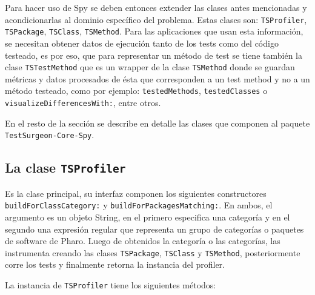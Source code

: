 \par Para hacer uso de Spy se deben entonces extender las clases antes mencionadas y acondicionarlas al dominio específico del problema. Estas clases son: {\tt TSProfiler}, {\tt TSPackage}, {\tt TSClass}, {\tt TSMethod}. Para las aplicaciones que usan esta información, se necesitan obtener datos de ejecución tanto de los tests como del código testeado, es por eso, que para representar un método de test se tiene también la clase {\tt TSTestMethod} que es un wrapper de la clase {\tt TSMethod} donde se guardan métricas y datos procesados de ésta que corresponden a un test method y no a un método testeado, como por ejemplo: {\tt testedMethods}, {\tt testedClasses} o {\tt visualizeDifferencesWith:}, entre otros.

\par En el resto de la sección se describe en detalle las clases que componen al paquete {\tt TestSurgeon-Core-Spy}.

\subsection{La clase {\tt TSProfiler}}

\par Es la clase principal, su interfaz componen los siguientes constructores {\tt buildForClassCategory:} y {\tt buildForPackagesMatching:}. En ambos, el argumento es un objeto String, en el primero especifica una categoría y en el segundo una expresión regular que representa un grupo de categorías o paquetes de software de Pharo. Luego de obtenidos la categoría o las categorías, las instrumenta creando las clases {\tt TSPackage}, {\tt TSClass} y {\tt TSMethod}, posteriormente corre los tests y finalmente retorna la instancia del profiler.

\par La instancia de {\tt TSProfiler} tiene los siguientes métodos:

